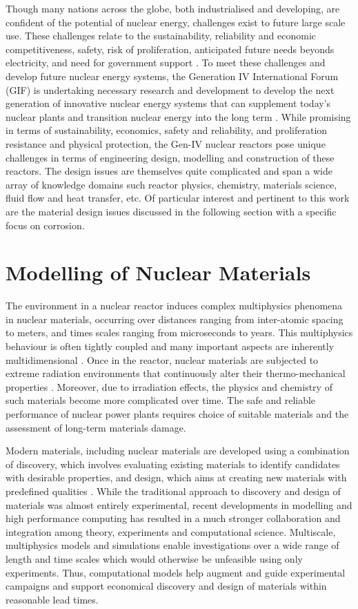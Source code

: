 	Though many nations across the globe, both industrialised and developing, are confident of the potential of nuclear energy, challenges exist to future large scale use. These challenges relate to the sustainability, reliability and economic competitiveness, safety, risk of proliferation, anticipated future needs beyonds electricity, and need for government support \cite{GIF:2009aa}. To meet these challenges and develop future nuclear energy systems, the Generation {IV} International Forum (GIF) is undertaking necessary research and development to develop the next generation of innovative nuclear energy systems that can supplement today's nuclear plants and transition nuclear energy into the long term \cite{GIF:2019aa}. While promising in terms of sustainability, economics, safety and reliability, and proliferation resistance and physical protection, the Gen-{IV} nuclear reactors pose unique challenges in terms of engineering design, modelling and construction of these reactors. The design issues are themselves quite complicated and span a wide array of knowledge domains such reactor physics, chemistry, materials science, fluid flow and heat transfer, etc. Of particular interest and pertinent to this work are the material design issues discussed in the following section with a specific focus on corrosion.
	
\section{Modelling of Nuclear Materials}
	The environment in a nuclear reactor induces complex multiphysics phenomena in nuclear materials, occurring over distances ranging from inter-atomic spacing to meters, and times scales ranging from microseconds to years. This multiphysics behaviour is often tightly coupled and many important aspects are inherently multidimensional  \cite{WILLIAMSON2012149}. Once in the reactor, nuclear materials are subjected to extreme radiation environments that continuously alter their thermo-mechanical properties \cite{STAN200920}. Moreover, due to irradiation effects, the physics and chemistry of such materials become more complicated over time. The safe and reliable performance of nuclear power plants requires choice of suitable materials and the assessment of long-term materials damage.
	
	Modern materials, including nuclear materials are developed using a combination of discovery, which involves evaluating existing materials to identify candidates with desirable properties, and design, which aims at  creating new materials with predefined qualities \cite{STAN200920}. While the traditional approach to discovery and design of materials was almost entirely experimental, recent developments in modelling and high performance computing has resulted in a much stronger collaboration and integration among theory, experiments and computational science. Multiscale, multiphysics models and simulations enable investigations over  a wide range of length and time scales which would otherwise be unfeasible using only experiments. Thus, computational models help augment and guide experimental campaigns and support economical discovery and design of materials within reasonable lead times.  


